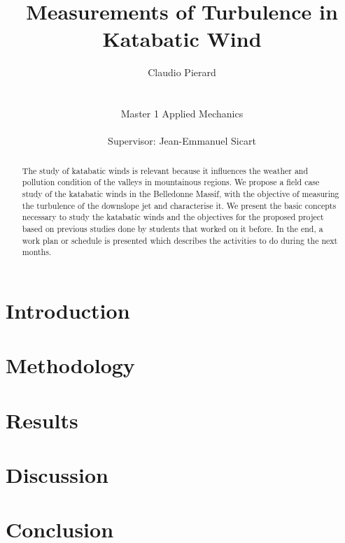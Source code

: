 \documentclass[a4paper,12pt]{article}
\title{Measurements of Turbulence in Katabatic Wind}
\author{Claudio Pierard \\
\\
\\
Master 1 Applied Mechanics\\
\\
Supervisor: Jean-Emmanuel Sicart}
\begin{document}
\renewcommand{\labelitemi}{$\bullet$}

\maketitle
\begin{abstract}
The study of katabatic winds is relevant because it influences the weather and pollution condition of the valleys in mountainous regions. We propose a field case study of the katabatic winds in the Belledonne Massif, with the objective of measuring the turbulence of the downslope jet and characterise it. We present the basic concepts necessary to study the katabatic winds and the objectives for the proposed project based on previous studies done by students that worked on it before. In the end, a work plan or schedule is presented which describes the activities to do during the next months.
   
\end{abstract}

\newpage

\tableofcontents

\newpage

\section{Introduction}


\section{Methodology}


\section{Results}


\section{Discussion}


\section{Conclusion}


\clearpage


\end{document}
